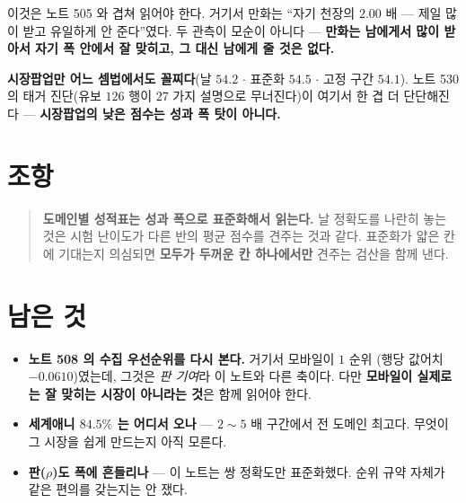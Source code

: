 \documentclass[11pt]{article}
\begin{document}
이것은 노트 505 와 겹쳐 읽어야 한다. 거기서 만화는 ``자기 천장의 $2.00$ 배
--- 제일 많이 받고 유일하게 안 준다''였다. 두 관측이 모순이 아니다 ---
\textbf{만화는 남에게서 많이 받아서 자기 폭 안에서 잘 맞히고, 그 대신 남에게
줄 것은 없다.}

\textbf{시장팝업만 어느 셈법에서도 꼴찌다}(날 $54.2$ $\cdot$ 표준화 $54.5$
$\cdot$ 고정 구간 $54.1$). 노트 530 의 태거 진단(유보 $126$ 행이 $27$ 가지
설명으로 무너진다)이 여기서 한 겹 더 단단해진다 --- \textbf{시장팝업의 낮은
점수는 성과 폭 탓이 아니다.}

\section*{조항}

\begin{quote}
\textbf{도메인별 성적표는 성과 폭으로 표준화해서 읽는다.} 날 정확도를 나란히
놓는 것은 시험 난이도가 다른 반의 평균 점수를 견주는 것과 같다. 표준화가
얇은 칸에 기대는지 의심되면 \textbf{모두가 두꺼운 칸 하나에서만} 견주는
검산을 함께 낸다.
\end{quote}

\section*{남은 것}

\begin{itemize}
\item \textbf{노트 508 의 수집 우선순위를 다시 본다.} 거기서 모바일이 $1$ 순위
(행당 값어치 $-0.0610$)였는데, 그것은 \emph{판 기여}라 이 노트와 다른 축이다.
다만 \textbf{모바일이 실제로는 잘 맞히는 시장이 아니라는 것}은 함께 읽어야 한다.
\item \textbf{세계애니 $84.5\%$ 는 어디서 오나} --- $2\!\sim\!5$ 배 구간에서
전 도메인 최고다. 무엇이 그 시장을 쉽게 만드는지 아직 모른다.
\item \textbf{판($\rho$)도 폭에 흔들리나} --- 이 노트는 쌍 정확도만 표준화했다.
순위 규약 자체가 같은 편의를 갖는지는 안 쟀다.
\end{itemize}
\end{document}
